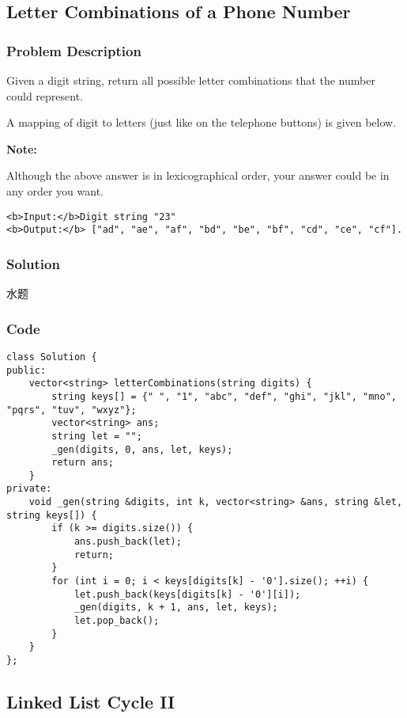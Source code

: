 \documentclass[courier]{article}
\begin{document}
\begin{CJK*}{UTF8}{gkai}
\begin{lstlisting}
\end{lstlisting}


\subsection{ Letter Combinations of a Phone Number }

\subsubsection*{Problem Description}
Given a digit string, return all possible letter combinations that the number could represent.

A mapping of digit to letters (just like on the telephone buttons) is given below.



\textbf{Note:}


Although the above answer is in lexicographical order, your answer could be in any order you want.

\begin{verbatim}
<b>Input:</b>Digit string "23"
<b>Output:</b> ["ad", "ae", "af", "bd", "be", "bf", "cd", "ce", "cf"].
\end{verbatim}


\subsubsection*{Solution}
水题

\subsubsection*{Code}
\begin{lstlisting}
class Solution {
public:
    vector<string> letterCombinations(string digits) {
        string keys[] = {" ", "1", "abc", "def", "ghi", "jkl", "mno", "pqrs", "tuv", "wxyz"};
        vector<string> ans;
        string let = "";
        _gen(digits, 0, ans, let, keys);
        return ans;
    }
private:
    void _gen(string &digits, int k, vector<string> &ans, string &let, string keys[]) {
        if (k >= digits.size()) {
            ans.push_back(let);
            return;
        }
        for (int i = 0; i < keys[digits[k] - '0'].size(); ++i) {
            let.push_back(keys[digits[k] - '0'][i]);
            _gen(digits, k + 1, ans, let, keys);
            let.pop_back();
        }
    }
}; 
\end{lstlisting}


\subsection{ Linked List Cycle II }


\end{CJK*}
\end{document}
